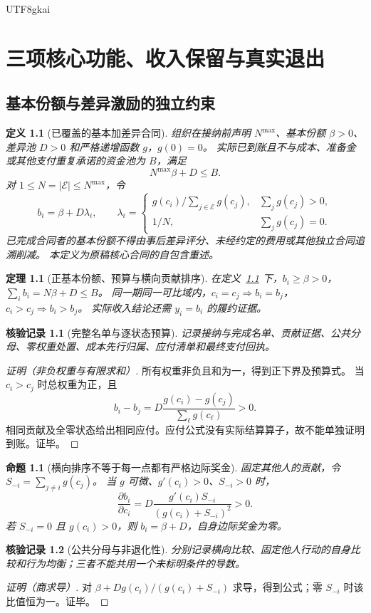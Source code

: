 \documentclass[12pt,a4paper,openany]{report}
\newtheorem{definition}{定义}[chapter]
\newtheorem{theorem}{定理}[chapter]
\newtheorem{proposition}{命题}[chapter]
\newtheorem{Certificate}{核验记录}[chapter]
\newcommand{\Original}{原稿}
\begin{document}
\begin{CJK*}{UTF8}{gkai}
\chapter{三项核心功能、收入保留与真实退出}
\label{chap:core}

\section{基本份额与差异激励的独立约束}

\begin{definition}[已覆盖的基本加差异合同]
\label{def:base-diff}
组织在接纳前声明 $N^{\max}$、基本份额 $\beta>0$、差异池 $D>0$ 和严格递增函数 $g$，$g(0)=0$。
实际已到账且不与成本、准备金或其他支付重复承诺的资金池为 $B$，满足
\[
 N^{\max}\beta+D\le B.
\]
对 $1\le N=|\mathcal E|\le N^{\max}$，令
\[
 b_i=\beta+D\lambda_i,\qquad
 \lambda_i=\begin{cases}
 g(c_i)/\sum_{j\in\mathcal E}g(c_j),&\sum_jg(c_j)>0,\\
 1/N,&\sum_jg(c_j)=0.
 \end{cases}
\]
已完成合同者的基本份额不得由事后差异评分、未经约定的费用或其他独立合同追溯削减。
本定义为\Original 核心合同的自包含重述。
\end{definition}

\begin{theorem}[正基本份额、预算与横向贡献排序]
\label{thm:base-diff}
在定义~\ref{def:base-diff} 下，$b_i\ge\beta>0$，$\sum_i b_i=N\beta+D\le B$。
同一期同一可比域内，$c_i=c_j\Rightarrow b_i=b_j$，$c_i>c_j\Rightarrow b_i>b_j$。
实际收入结论还需 $y_i=b_i$ 的履约证据。
\end{theorem}
\begin{Certificate}[完整名单与逐状态预算]
记录接纳与完成名单、贡献证据、公共分母、零权重处置、成本先行归属、应付清单和最终支付回执。
\end{Certificate}
\begin{proof}[证明（非负权重与有限求和）]
所有权重非负且和为一，得到正下界及预算式。
当 $c_i>c_j$ 时总权重为正，且
\[
 b_i-b_j=D\frac{g(c_i)-g(c_j)}{\sum_\ell g(c_\ell)}>0.
\]
相同贡献及全零状态给出相同应付。应付公式没有实际结算算子，故不能单独证明到账。证毕。
\end{proof}

\begin{proposition}[横向排序不等于每一点都有严格边际奖金]
\label{prop:own-marginal}
固定其他人的贡献，令 $S_{-i}=\sum_{j\ne i}g(c_j)$。
当 $g$ 可微、$g'(c_i)>0$、$S_{-i}>0$ 时，
\[
 \frac{\partial b_i}{\partial c_i}
 =D\frac{g'(c_i)S_{-i}}{(g(c_i)+S_{-i})^2}>0.
\]
若 $S_{-i}=0$ 且 $g(c_i)>0$，则 $b_i=\beta+D$，自身边际奖金为零。
\end{proposition}
\begin{Certificate}[公共分母与非退化性]
分别记录横向比较、固定他人行动的自身比较和行为均衡；三者不能共用一个未标明条件的导数。
\end{Certificate}
\begin{proof}[证明（商求导）]
对 $\beta+Dg(c_i)/(g(c_i)+S_{-i})$ 求导，得到公式；零 $S_{-i}$ 时该比值恒为一。证毕。
\end{proof}


\end{CJK*}
\end{document}
